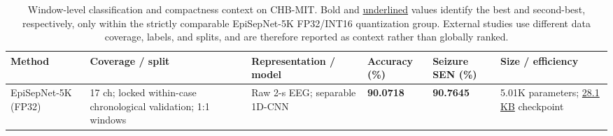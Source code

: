 \begin{table}[t]
\caption{Window-level classification and compactness context on CHB-MIT.
Bold and \underline{underlined} values identify the best and second-best,
respectively, only within the strictly comparable EpiSepNet-5K FP32/INT16
quantization group. External studies use different data coverage, labels, and
splits, and are therefore reported as context rather than globally ranked.}
\label{tab:window-hardware-context}
\centering
\scriptsize
\setlength{\tabcolsep}{3pt}
\renewcommand{\arraystretch}{1.12}
\begin{tabularx}{\textwidth}{p{2.8cm}p{3.1cm}Xp{1.35cm}p{1.35cm}p{2.75cm}}
\toprule
Method & Coverage / split & Representation / model & Accuracy (\%) & Seizure SEN (\%) & Size / efficiency \\
\midrule
EpiSepNet-5K (FP32) &
17 ch; locked within-case chronological validation; 1:1 windows &
Raw 2-s EEG; separable 1D-CNN &
\textbf{90.0718} & \textbf{90.7645} &
5.01K parameters; \underline{28.1 KB} checkpoint \\


\end{tabularx}
\end{table}
